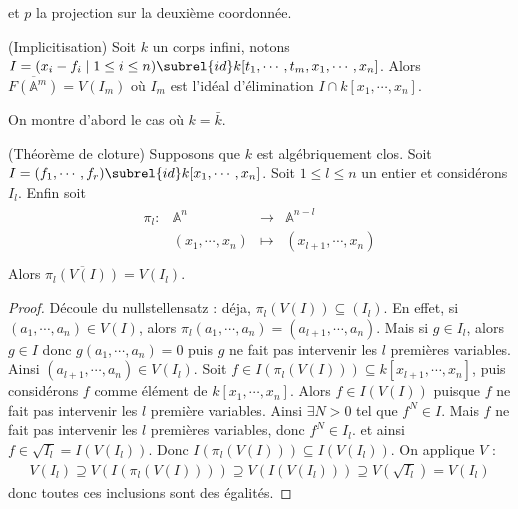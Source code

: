         et $p$ la projection sur la deuxième coordonnée.
        \begin{theo} \label{implicitisation} (Implicitisation)
            Soit $k$ un corps infini, notons \linebreak $I = (x_i - f_i \mid 1 \leq i \leq n) \subrel{id} k[t_1, \cdots, t_m, x_1, \cdots, x_n]$. Alors $\overline{F(\mathbb{A}^m)} = V(I_m)$ où $I_m$ est l'idéal d'élimination $I \cap k[x_1, \cdots, x_n]$.
        \end{theo}
        On montre d'abord le cas où $k = \bar k$.
        \begin{theo} (Théorème de cloture)
            Supposons que $k$ est algébriquement clos. Soit $I = (f_1, \cdots, f_r) \subrel{id} k[x_1, \cdots, x_n]$. Soit $1 \leq l \leq n$ un entier et considérons $I_l$. Enfin soit
            \begin{align}
                \begin{array}{cccc}
                    \pi_l : & \mathbb{A}^n & \to & \mathbb{A}^{n-l} \\
                    & (x_1, \cdots, x_n) & \mapsto & (x_{l+1}, \cdots, x_n) \\
                \end{array}
            \end{align}
            Alors $\overline{\pi_l(V(I))} = V(I_l)$.  
        \end{theo}
        \begin{proof}
            Découle du nullstellensatz : déja, $\pi_l(V(I)) \subseteq(I_l)$. En effet, si $(a_1, \cdots, a_n) \in V(I)$, alors $\pi_l(a_1, \cdots, a_n) = (a_{l+1}, \cdots, a_n)$. Mais si $g \in I_l$, alors $g \in I$ donc $g(a_1, \cdots, a_n) = 0$ puis $g$ ne fait pas intervenir les $l$ premières variables. Ainsi $(a_{l+1}, \cdots, a_n) \in V(I_l)$. Soit $f \in I(\pi_l(V(I))) \subseteq k[x_{l+1}, \cdots, x_n]$, puis considérons $f$ comme élément de $k[x_1, \cdots, x_n]$. Alors $f \in I(V(I))$ puisque $f$ ne fait pas intervenir les $l$ première variables. Ainsi $\exists N > 0$ tel que $f^N \in I$. Mais $f$ ne fait pas intervenir les $l$ premières variables, donc $f^N \in I_l$. et ainsi $f \in \sqrt{I_l} = I(V(I_l))$. Donc $I(\pi_l(V(I))) \subseteq I(V(I_l))$.  On applique $V$ : 
            \begin{align*}
                V(I_l) \supseteq V(I(\pi_l(V(I)))) \supseteq V(I(V(I_l))) \supseteq V(\sqrt{I_l}) = V(I_l)
            \end{align*}
            donc toutes ces inclusions sont des égalités. 
        \end{proof}
